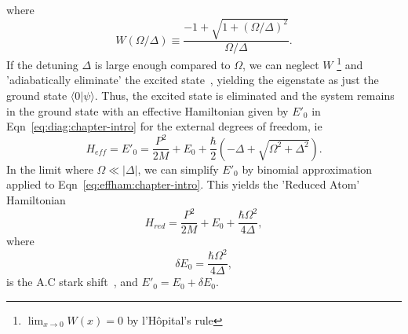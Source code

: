 where
\begin{equation}
W\left(\Omega/\Delta\right) \equiv \frac{-1+\sqrt{1+\left( \Omega/\Delta \right)^2}} {\Omega/\Delta}.
\label{eq:w:chapter-intro} 
\end{equation}
If the detuning $\Delta$ is large enough compared to $\Omega$, we can neglect $W$ 
\footnote{$\lim_{x \to 0}W(x)=0$ by l'H\^{o}pital's rule} and 'adiabatically eliminate' the excited state~\cite{graham}, yielding the eigenstate as just the ground state $\langle 0|\psi\rangle$. Thus, the excited state is eliminated and the system remains in the ground state with an effective Hamiltonian given by $E'_0$ in Eqn~\ref{eq:diag:chapter-intro} for the external degrees of freedom, ie
\begin{equation}
H_{eff}=E'_0=\frac{P^2}{2M}+E_0+ \frac{\hbar}{2} \left( -\Delta + \sqrt{\Omega^2 + \Delta^2} \right).
\label{eq:effham:chapter-intro}
\end{equation}
In the limit where $\Omega \ll |\Delta|$, we can simplify $E'_0$ by binomial approximation applied to Eqn~\ref{eq:effham:chapter-intro}.  This yields the 'Reduced Atom' Hamiltonian
\begin{equation}
H_{red}=\frac{P^2}{2M}+E_0+\frac{\hbar \Omega^2}{4\Delta},
\label{eq:redhamilt:chapter-intro}
\end{equation}
where
\begin{equation}
\delta E _0 = \frac{\hbar \Omega^2}{4\Delta},
\label{eq:starkshifts:chapter-intro}
\end{equation}
is the A.C stark shift~\cite{metcalf:vanderstraten}, and $E'_0=E_0 + \delta E_0$. 


